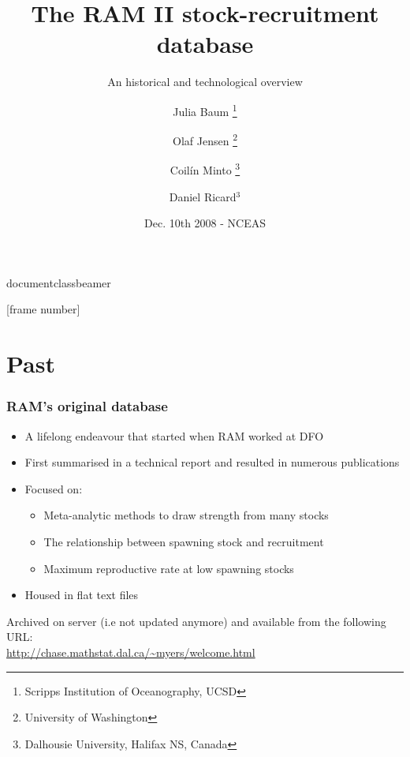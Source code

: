 documentclass{beamer}
\usepackage{fancybox}
\usepackage{beamerthemesplit}
\usepackage{hyperref}
\usepackage{comment}

 {

[frame number]

  }
\title[Updated stock-recruitment DB]{The RAM II stock-recruitment database}
\subtitle{An historical and technological overview}
\author[Baum, Minto and Ricard]{Julia Baum \thanks{Scripps Institution of Oceanography, UCSD} \and Olaf Jensen \thanks{University of Washington} \and Coil\'{i}n Minto \thanks{Dalhousie University, Halifax NS, Canada} \and Daniel Ricard$^{3}$}

\date{Dec. 10th 2008 - NCEAS}




\frame{\titlepage}



\section{Past}

\begin{frame}
\frametitle{RAM's original database}

\begin{itemize}
 \item A lifelong endeavour that started when RAM worked at DFO
 \item First summarised in a technical report and resulted in numerous publications
 \item Focused on:
\begin{itemize}
 \item Meta-analytic methods to draw strength from many stocks
 \item The relationship between spawning stock and recruitment 
 \item Maximum reproductive rate at low spawning stocks
\end{itemize}
 \item Housed in flat text files
\end{itemize}

Archived on server (i.e not updated anymore) and available from the following URL:\\
\url{http://chase.mathstat.dal.ca/~myers/welcome.html}

\end{frame}


